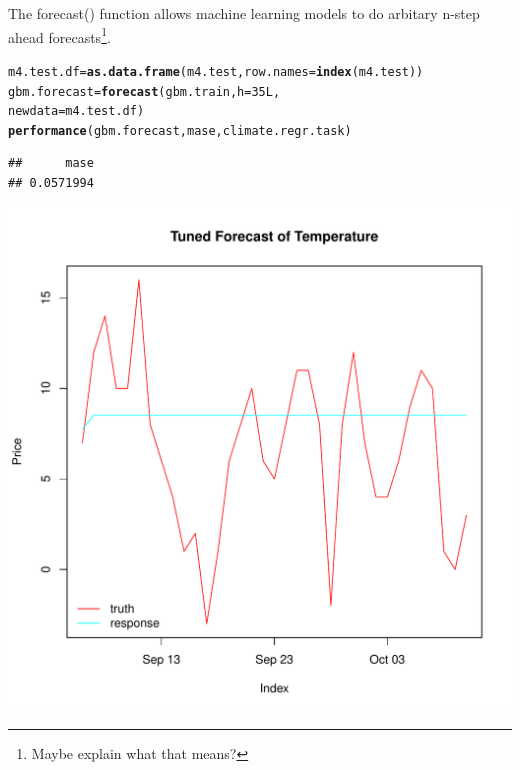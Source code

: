 \documentclass{article}\usepackage[]{graphicx}\usepackage[]{color}
\makeatletter
\def\maxwidth{ %
  \ifdim\Gin@nat@width>\linewidth
    \linewidth
  \else
    \Gin@nat@width
  \fi
}
\newcommand{\hlnum}[1]{\textcolor[rgb]{0.686,0.059,0.569}{#1}}%
\newcommand{\hlstd}[1]{\textcolor[rgb]{0.345,0.345,0.345}{#1}}%
\newcommand{\hlkwb}[1]{\textcolor[rgb]{0.69,0.353,0.396}{#1}}%
\newcommand{\hlkwc}[1]{\textcolor[rgb]{0.333,0.667,0.333}{#1}}%
\newcommand{\hlkwd}[1]{\textcolor[rgb]{0.737,0.353,0.396}{\textbf{#1}}}%
\newenvironment{kframe}{%
 \def\at@end@of@kframe{}%
 \ifinner\ifhmode%
  \def\at@end@of@kframe{\end{minipage}}%
  \begin{minipage}{\columnwidth}%
 \fi\fi%
 \def\FrameCommand##1{\hskip\@totalleftmargin \hskip-\fboxsep
 \colorbox{shadecolor}{##1}\hskip-\fboxsep
     \hskip-\linewidth \hskip-\@totalleftmargin \hskip\columnwidth}%
 \MakeFramed {\advance\hsize-\width
   \@totalleftmargin\z@ \linewidth\hsize
   \@setminipage}}%
 {\par\unskip\endMakeFramed%
 \at@end@of@kframe}
\newenvironment{knitrout}{}{} %
\theoremstyle{definition}
\newcommand\code{\@codex}
\def\@codex#1{{\normalfont\ttfamily\hyphenchar\font=-1 #1}}
\makeatother
\begin{document}
The \code{forecast()} function allows machine learning models to do arbitary n-step ahead forecasts\footnote{Maybe explain what that means?}.

\begin{knitrout}
\color{fgcolor}\begin{kframe}
\begin{alltt}
\hlstd{m4.test.df} \hlkwb{=} \hlkwd{as.data.frame}\hlstd{(m4.test,}\hlkwc{row.names} \hlstd{=} \hlkwd{index}\hlstd{(m4.test))}
\hlstd{gbm.forecast} \hlkwb{=} \hlkwd{forecast}\hlstd{(gbm.train,} \hlkwc{h} \hlstd{=} \hlnum{35L}\hlstd{,}
                        \hlkwc{newdata} \hlstd{= m4.test.df)}
\hlkwd{performance}\hlstd{(gbm.forecast,mase,climate.regr.task)}
\end{alltt}
\begin{verbatim}
##      mase 
## 0.0571994
\end{verbatim}
\end{kframe}
\end{knitrout}

\begin{knitrout}
\color{fgcolor}
\includegraphics[width=\maxwidth]{figure/forecastgbmplot-1} 

\end{knitrout}
\end{document}
